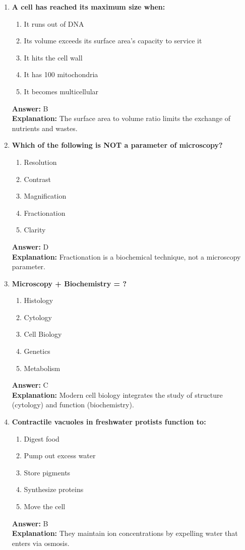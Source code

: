 \documentclass[11pt, a4paper]{article}
\begin{document}
\begin{enumerate}[leftmargin=*, label=\arabic*.]
\item \textbf{A cell has reached its maximum size when:}
\begin{enumerate}[label=\Alph*.]
\item It runs out of DNA
\item Its volume exceeds its surface area's capacity to service it
\item It hits the cell wall
\item It has 100 mitochondria
\item It becomes multicellular
\end{enumerate}
\textbf{Answer:} B \\
\textbf{Explanation:} The surface area to volume ratio limits the exchange of nutrients and wastes.

\item \textbf{Which of the following is NOT a parameter of microscopy?}
\begin{enumerate}[label=\Alph*.]
\item Resolution
\item Contrast
\item Magnification
\item Fractionation
\item Clarity
\end{enumerate}
\textbf{Answer:} D \\
\textbf{Explanation:} Fractionation is a biochemical technique, not a microscopy parameter.

\item \textbf{Microscopy + Biochemistry = ?}
\begin{enumerate}[label=\Alph*.]
\item Histology
\item Cytology
\item Cell Biology
\item Genetics
\item Metabolism
\end{enumerate}
\textbf{Answer:} C \\
\textbf{Explanation:} Modern cell biology integrates the study of structure (cytology) and function (biochemistry).

\item \textbf{Contractile vacuoles in freshwater protists function to:}
\begin{enumerate}[label=\Alph*.]
\item Digest food
\item Pump out excess water
\item Store pigments
\item Synthesize proteins
\item Move the cell
\end{enumerate}
\textbf{Answer:} B \\
\textbf{Explanation:} They maintain ion concentrations by expelling water that enters via osmosis.


\end{enumerate}
\end{document}
